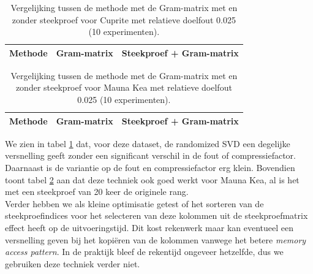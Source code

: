 \begin{table}[]
\centering
\begin{tabular}{|l|l|l|}
\hline
Methode & Gram-matrix & Steekproef + Gram-matrix\\ \hline

\end{tabular}
\caption{Vergelijking tussen de methode met de Gram-matrix met en zonder steekproef voor Cuprite met relatieve doelfout 0.025 (10 experimenten).}
\label{table:randomized-svd-cuprite-average}
\end{table}

\begin{table}[]
\centering
\begin{tabular}{|l|l|l|}
\hline
Methode & Gram-matrix & Steekproef + Gram-matrix\\ \hline

\end{tabular}
\caption{Vergelijking tussen de methode met de Gram-matrix met en zonder steekproef voor Mauna Kea met relatieve doelfout 0.025 (10 experimenten).}
\label{table:randomized-svd-mauna-kea-average}
\end{table}

We zien in tabel \ref{table:randomized-svd-cuprite-average} dat, voor deze dataset, de randomized SVD een degelijke versnelling geeft zonder een significant verschil in de fout of compressiefactor. Daarnaast is de variantie op de fout en compressiefactor erg klein. Bovendien toont tabel \ref{table:randomized-svd-mauna-kea-average} aan dat deze techniek ook goed werkt voor Mauna Kea, al is het met een steekproef van 20 keer de originele rang.\\

Verder hebben we als kleine optimisatie getest of het sorteren van de steekproefindices voor het selecteren van deze kolommen uit de steekproefmatrix effect heeft op de uitvoeringstijd. Dit kost rekenwerk maar kan eventueel een versnelling geven bij het kopi\"eren van de kolommen vanwege het betere \textit{memory access pattern}. In de praktijk bleef de rekentijd ongeveer hetzelfde, dus we gebruiken deze techniek verder niet.\\

